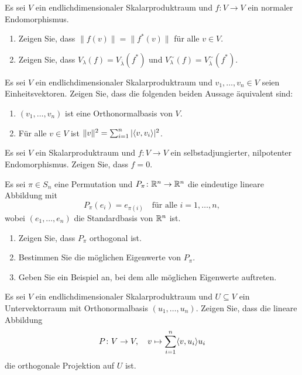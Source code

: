 \documentclass[a4paper,10pt]{scrartcl}
\begin{document}
\begin{question}
  Es sei $V$ ein endlichdimensionaler Skalarproduktraum und $f \colon V \to V$ ein normaler Endomorphismus.
  \begin{enumerate}[leftmargin=*]
    \item
      Zeigen Sie, dass $\|f(v)\| = \|f^*(v)\|$ für alle $v \in V$.
    \item
      Zeigen Sie, dass $V_\lambda(f) = V_{\overline{\lambda}}(f^*)$ und $V^\sim_\lambda(f) = V^\sim_{\overline{\lambda}}(f^*)$.
  \end{enumerate}
\end{question}


\begin{question}
  Es sei $V$ ein endlichdimensionaler Skalarproduktraum und $v_1, \dotsc, v_n \in V$ seien Einheitsvektoren.
  Zeigen Sie, dass die folgenden beiden Aussage äquivalent sind:
  \begin{enumerate}
    \item
      $(v_1, \dotsc, v_n)$ ist eine Orthonormalbasis von $V$.
    \item
      Für alle $v \in V$ ist $\| v \|^2 = \sum_{i=1}^n |\langle v, v_i \rangle|^2$.
  \end{enumerate}
\end{question}


\begin{question}
  Es sei $V$ ein Skalarproduktraum und $f \colon V \to V$ ein selbstadjungierter, nilpotenter Endomorphismus.
  Zeigen Sie, dass $f = 0$.
\end{question}


\begin{question}
  Es sei $\pi \in S_n$ eine Permutation und $P_\pi \colon \mathbb{R}^n \to \mathbb{R}^n$ die eindeutige lineare Abbildung mit
  \[
    P_\pi(e_i) = e_{\pi(i)}
    \quad
    \text{für alle $i = 1, \dotsc, n$},
  \]
  wobei $(e_1, \dotsc, e_n)$ die Standardbasis von $\mathbb{R}^n$ ist.
  \begin{enumerate}[leftmargin=*]
    \item
      Zeigen Sie, dass $P_\pi$ orthogonal ist.
    \item
      Bestimmen Sie die möglichen Eigenwerte von $P_\pi$.
    \item
      Geben Sie ein Beispiel an, bei dem alle möglichen Eigenwerte auftreten.
  \end{enumerate}
\end{question}


\begin{question}
  Es sei $V$ ein endlichdimensionaler Skalarproduktraum und $U \subseteq V$ ein Untervektorraum mit Orthonormalbasis $(u_1, \dotsc, u_n)$.
  Zeigen Sie, dass die lineare Abbildung
  \[
    P \colon V \to V,
    \quad
    v \mapsto \sum_{i=1}^n \langle v, u_i \rangle u_i
  \]
  die orthogonale Projektion auf $U$ ist.
\end{question}
\end{document}
